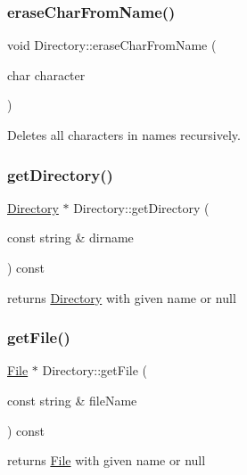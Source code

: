 \subsubsection{\texorpdfstring{erase\+Char\+From\+Name()}{eraseCharFromName()}}
{\footnotesize\ttfamily void Directory\+::erase\+Char\+From\+Name (\begin{DoxyParamCaption}\item[{char}]{character }\end{DoxyParamCaption})\hspace{0.3cm}{\ttfamily [inline]}}



Deletes all characters in names recursively. 

\mbox{\label{class_directory_a1deb0931a93badb556a4faed75cbc033}} 
\subsubsection{\texorpdfstring{get\+Directory()}{getDirectory()}}
{\footnotesize\ttfamily \hyperlink{class_directory}{Directory} $\ast$ Directory\+::get\+Directory (\begin{DoxyParamCaption}\item[{const string \&}]{dirname }\end{DoxyParamCaption}) const}



returns \hyperlink{class_directory}{Directory} with given name or null 

\mbox{\label{class_directory_a3a7c1f0d955b7c3a73f6701db1fdf72b}} 
\subsubsection{\texorpdfstring{get\+File()}{getFile()}}
{\footnotesize\ttfamily \hyperlink{class_file}{File} $\ast$ Directory\+::get\+File (\begin{DoxyParamCaption}\item[{const string \&}]{file\+Name }\end{DoxyParamCaption}) const}



returns \hyperlink{class_file}{File} with given name or null 

